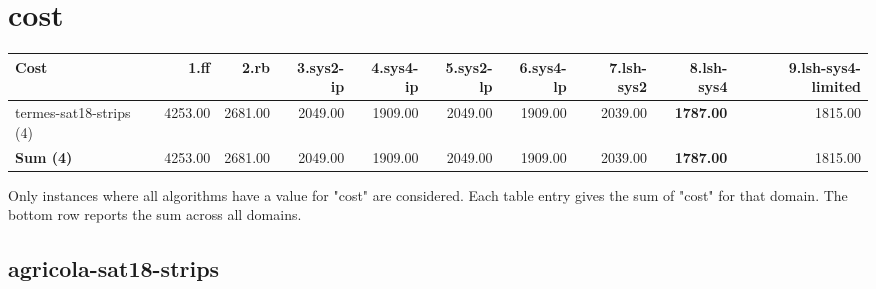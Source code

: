 \documentclass{article}
\newcommand{\numtasks}[1]{\small{(#1)}}
\begin{document}
\hypertarget{cost}{}
\section*{cost}

\begin{tabular}{@{}lrrrrrrrrr@{}}
Cost & 1.ff & 2.rb & 3.sys2-ip & 4.sys4-ip & 5.sys2-lp & 6.sys4-lp & 7.lsh-sys2 & 8.lsh-sys4 & 9.lsh-sys4-limited \\
\midrule
termes-sat18-strips \numtasks{4} & 4253.00 & 2681.00 & 2049.00 & 1909.00 & 2049.00 & 1909.00 & 2039.00 & \textbf{1787.00} & 1815.00 \\
\textbf{Sum \numtasks{4}} & 4253.00 & 2681.00 & 2049.00 & 1909.00 & 2049.00 & 1909.00 & 2039.00 & \textbf{1787.00} & 1815.00 \\
\end{tabular}

Only instances where all algorithms have a value for "cost" are considered. Each table entry gives the sum of "cost" for that domain. The bottom row reports the sum across all domains.

\hypertarget{cost-agricola-sat18-strips}{}
\subsection*{agricola-sat18-strips}
\end{document}
